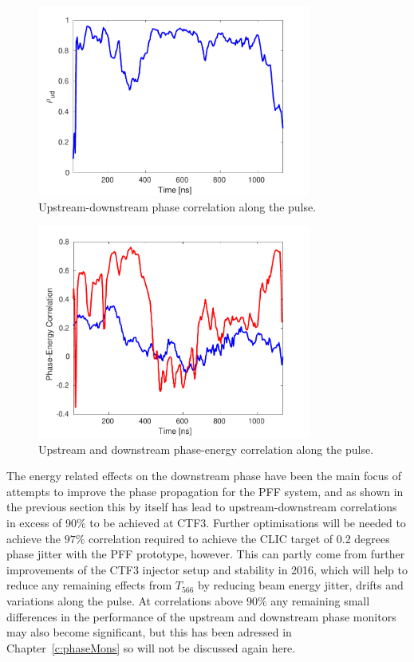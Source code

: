 \begin{figure}
  \centering
  \includegraphics[width=0.8\textwidth]{Figures/propagation/bestProp_corrAlong}
  \caption{Upstream-downstream phase correlation along the pulse.}
  \label{f:bestProp_corrAlong}
\end{figure}

\begin{figure}
  \centering
  \includegraphics[width=0.8\textwidth]{Figures/propagation/bestProp_enCorrAlong}
  \caption{Upstream and downstream phase-energy correlation along the pulse.}
  \label{f:bestProp_enCorrAlong}
\end{figure}


The energy related effects on the downstream phase have been the main focus of attempts to improve the phase propagation for the PFF system, and as shown in the previous section this by itself has lead to upstream-downstream correlations in excess of 90\% to be achieved at CTF3. Further optimisations will be needed to achieve the \(97\%\) correlation required to achieve the CLIC target of 0.2 degrees phase jitter with the PFF prototype, however. This can partly come from further improvements of the CTF3 injector setup and stability in 2016, which will help to reduce any remaining effects from \(T_{566}\) by reducing beam energy jitter, drifts and variations along the pulse. At correlations above \(90\%\) any remaining small differences in the performance of the upstream and downstream phase monitors may also become significant, but this has been adressed in Chapter~\ref{c:phaseMons} so will not be discussed again here.

